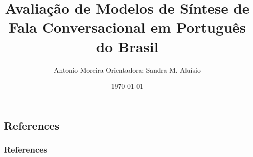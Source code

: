 \documentclass{beamer}
\title[DiaTTS-Toolkit]{Avaliação de Modelos de Síntese de Fala Conversacional em
Português do Brasil}
\institute{ICMC - USP}
\author[Antonio Moreira]{Antonio Moreira\texorpdfstring{\newline}{,} Orientadora: Sandra M. Aluísio}
\date{\today}
\begin{document}
\begin{frame}
  \titlepage
\end{frame}








\appendix
\section*{\appendixname}
\subsection*{References}

\begin{frame}[allowframebreaks]
  \frametitle<presentation>{References}
  \printbibliography
\end{frame}
\end{document}
